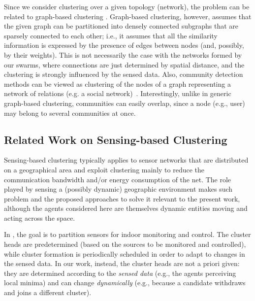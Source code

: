 Since we consider clustering over a given topology (network), 
 the problem can be related to graph-based clustering \cite{Zheng:2010}.
Graph-based clustering, however, assumes that the given graph can be partitioned into densely connected subgraphs that are sparsely connected to each other; i.e.,
it assumes that all the similarity information is expressed by the presence of edges between nodes (and, possibly, by their weights).
This is not necessarily the case with the networks formed by our swarms, 
 where connections are just determined by spatial distance, 
 and the clustering is strongly influenced by the sensed data.
Also, community detection methods can be viewed as clustering of the nodes of a graph representing a network of relations (e.g. a social network)~\cite{DBLP:journals/jnca/JavedYLQB18}.
Interestingly, unlike in generic graph-based clustering, communities can easily overlap, since a node (e.g., user) may belong to several communities at once.

\subsection{Related Work on Sensing-based Clustering}
\label{s:rw:related-sensingbased-clustering}

Sensing-based clustering typically applies to sensor networks that are distributed on a geographical area and exploit clustering mainly to reduce the communication bandwidth and/or energy consumption of the net.
 The role played by sensing a (possibly dynamic) geographic environment makes such problem and the proposed approaches to solve it relevant to the present work,
 although the agents considered here are themselves dynamic entities moving and acting across the space.

In \cite{DBLP:conf/ccnc/LinM07}, 
 the goal is to partition sensors for indoor monitoring and control. 
 The cluster heads are predetermined (based on the sources to be monitored and controlled),
 while cluster formation is periodically scheduled in order to adapt to changes in the sensed data.
%
In our work, instead, the cluster heads are not a priori given:
 they are determined according to the \emph{sensed data}
 (e.g., the agents perceiving local minima)
 and can change \emph{dynamically}
 (e.g., because a candidate withdraws and joins a different cluster).

